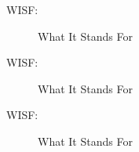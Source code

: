 

\ifoddmakenewpage




%
%


\listofacronyms %


\begin{description}
\item[WISF:] What It Stands For
\item[WISF:] What It Stands For
\item[WISF:] What It Stands For
\end{description}





\ifoddmakenewpage




%
%

\listoffigures
\ifoddmakenewpage
\listoftables
\ifoddmakenewpage
\listofalgorithms
\ifoddmakenewpage

